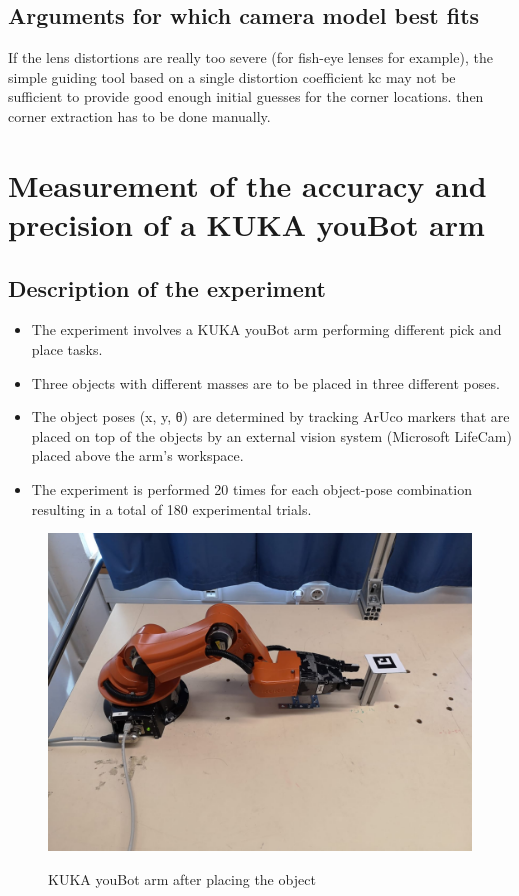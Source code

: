 \documentclass[11pt,a4paper]{article}
\begin{document}
				
				\subsection{Arguments for which camera model best fits} 
				If the lens distortions are really too severe (for fish-eye lenses for example), the simple guiding tool based on a single distortion coefficient kc may not be sufficient to provide good enough initial guesses for the corner locations. then corner extraction has to be done manually.
				
				\newpage
				\section{Measurement of the accuracy and precision of a KUKA youBot arm}
				\subsection{Description of the experiment}
				\begin{itemize}
				\item The experiment involves a KUKA youBot arm performing different pick and place tasks.
				\item Three objects with different masses are to be placed in three different poses.
				\item The object poses (x, y, θ) are determined by tracking ArUco markers that are placed on top of the objects by an external vision system (Microsoft LifeCam) placed above the arm's workspace.
				\item The experiment is performed 20 times for each object-pose combination resulting in a total of 180 experimental trials.
				\end{itemize}
				\begin{figure}[H]
					\centering
					\includegraphics[scale=0.2]{youbot_1}
					\label{Youbot}
					\caption{KUKA youBot arm after placing the object }
				\end{figure}
\end{document}

